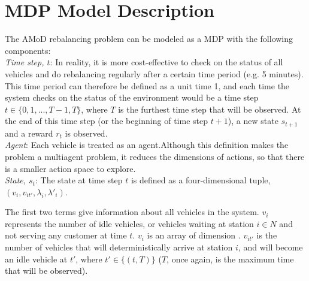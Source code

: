 
\section{MDP Model Description}
The AMoD rebalancing problem can be modeled as a MDP with the following components: \\

\noindent \textit{Time step, $t$}: In reality, it is more cost-effective to check on the status of all vehicles and do rebalancing regularly after a certain time period (e.g. 5 minutes). This time period can therefore be defined as a unit time 1, and each time the system checks on the status of the environment would be a time step $t \in \{0,1,...,T-1,T\}$, where $T$ is the furthest time step that will be observed.  At the end of this time step (or the beginning of time step $t+1$), a new state $s_{t+1}$ and a reward $r_t$ is observed.\\

\noindent \textit{Agent}: Each vehicle is treated as an agent.Although this definition makes the problem a multiagent problem, it reduces the dimensions of actions, so that there is a smaller action space to explore. \\

\noindent \textit{State, $s_t$}: The state at time step $t$ is defined as a four-dimensional tuple, $(v_i,v_{it'},\lambda_i,\lambda'_i)$.

The first two terms give information about all vehicles in the system.  $v_i$ represents the number of idle vehicles, or vehicles waiting at station $i\in N$ and not serving any customer at time $t$. $v_i$ is an array of dimension . $v_{it'}$ is the number of vehicles that will deterministically arrive at station $i$, and will become an idle vehicle at $t'$, where $t'\in \{(t,T)\}$ ($T$, once again, is the maximum time that will be observed). 

